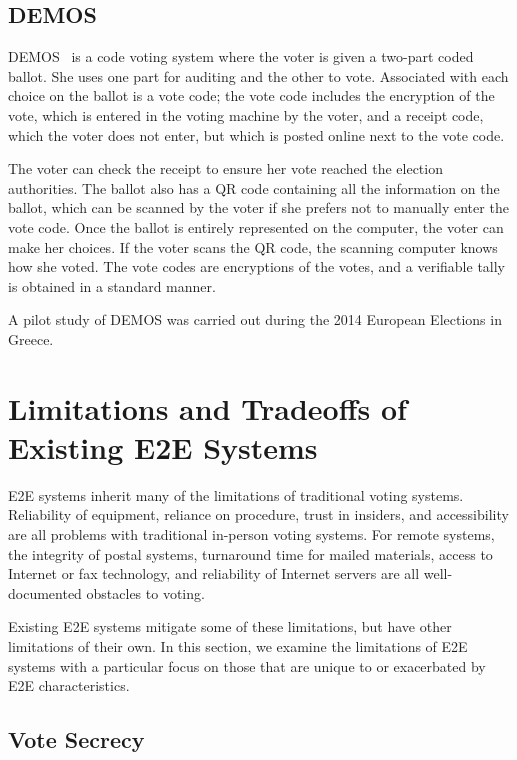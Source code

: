 \subsection{DEMOS}

DEMOS~\cite{kiayias2014} is a code voting system where the voter is
given a two-part coded ballot. She uses one part for auditing and the
other to vote. Associated with each choice on the ballot is a vote
code; the vote code includes the encryption of the vote, which is
entered in the voting machine by the voter, and a receipt code, which
the voter does not enter, but which is posted online next to the vote
code.

The voter can check the receipt to ensure her vote reached the
election authorities. The ballot also has a QR code containing all the
information on the ballot, which can be scanned by the voter if she
prefers not to manually enter the vote code. Once the ballot is
entirely represented on the computer, the voter can make her
choices. If the voter scans the QR code, the scanning computer knows
how she voted. The vote codes are encryptions of the votes, and a
verifiable tally is obtained in a standard manner.

A pilot study of DEMOS was carried out during the 2014 European
Elections in Greece.

\section{Limitations and Tradeoffs of Existing E2E Systems}
\label{sec:limit-exist-syst}

E2E systems inherit many of the limitations of traditional voting
systems. Reliability of equipment, reliance on procedure, trust in
insiders, and accessibility are all problems with traditional
in-person voting systems. For remote systems, the integrity of postal
systems, turnaround time for mailed materials, access to Internet or
fax technology, and reliability of Internet servers are all
well-documented obstacles to voting. 

Existing E2E systems mitigate some of these limitations, but have
other limitations of their own. In this section, we examine the
limitations of E2E systems with a particular focus on those that are
unique to or exacerbated by E2E characteristics.

\subsection{Vote Secrecy}

